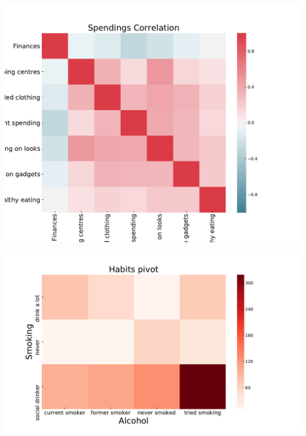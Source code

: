 \documentclass[russian, 10pt]{beamer}
\begin{document}
\begin{frame}

\centering
\includegraphics[scale=0.45]{images/7.pdf}

\end{frame}


\begin{frame}

\centering
\includegraphics[scale=0.45]{images/8.pdf}

\end{frame}
\end{document}
